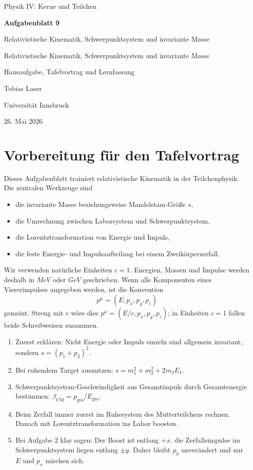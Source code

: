 \documentclass[11pt,a4paper]{scrartcl}
\newcommand{\CourseTitle}{COURSE NAME}
\newcommand{\DocumentKind}{DOCUMENT KIND}
\newcommand{\DocumentTitle}{DOCUMENT TITLE}
\newcommand{\DocumentSubtitle}{}
\newcommand{\AuthorName}{YOUR NAME}
\newcommand{\InstitutionName}{INSTITUTION NAME}
\newcommand{\SubmissionDate}{\today}
\newcommand{\makeuniversitytitle}{%
    \begin{titlepage}
        \centering
        \vspace*{2cm}
        {\Large \CourseTitle\par}
        \vspace{1.2cm}
        {\huge\bfseries \DocumentTitle\par}
        \ifx\DocumentSubtitle\empty\else
            \vspace{0.4cm}
            {\Large \DocumentSubtitle\par}
        \fi
        \vspace{1cm}
        {\Large \DocumentKind\par}
        \vfill
        {\large \AuthorName\par}
        \vspace{0.2cm}
        {\large \InstitutionName\par}
        \vspace{0.8cm}
        {\large \SubmissionDate\par}
    \end{titlepage}
    \pagenumbering{arabic}
}
\renewcommand{\CourseTitle}{Physik IV: Kerne und Teilchen}
\renewcommand{\DocumentKind}{Hausaufgabe, Tafelvortrag und Lernfassung}
\renewcommand{\DocumentTitle}{Aufgabenblatt 9}
\renewcommand{\DocumentSubtitle}{Relativistische Kinematik, Schwerpunktsystem und invariante Masse}
\renewcommand{\AuthorName}{Tobias Laser}
\renewcommand{\InstitutionName}{Universit\"at Innsbruck}
\renewcommand{\SubmissionDate}{26. Mai 2026}
\newcommand{\MeV}{\si{MeV}}
\newcommand{\GeV}{\si{GeV}}
\theoremstyle{definition}
\theoremstyle{plain}
\theoremstyle{remark}
\begin{document}
\makeuniversitytitle
\tableofcontents
\newpage


\section*{Vorbereitung f\"ur den Tafelvortrag}

\begin{summarybox}[title={Was man aus diesem Blatt lernen soll}]
Dieses Aufgabenblatt trainiert relativistische Kinematik in der Teilchenphysik. Die zentralen Werkzeuge sind
\begin{itemize}
    \item die invariante Masse beziehungsweise Mandelstam-Gr\"o\ss e $s$,
    \item die Umrechnung zwischen Laborsystem und Schwerpunktsystem,
    \item die Lorentztransformation von Energie und Impuls,
    \item die feste Energie- und Impulsaufteilung bei einem Zweik\"orperzerfall.
\end{itemize}
Wir verwenden nat\"urliche Einheiten $c=1$. Energien, Massen und Impulse werden deshalb in $\MeV$ oder $\GeV$ geschrieben. Wenn alle Komponenten eines Viererimpulses angegeben werden, ist die Konvention
\[
    p^\mu = (E,p_x,p_y,p_z)
\]
gemeint. Streng mit $c$ w\"are dies $p^\mu=(E/c,p_x,p_y,p_z)$; in Einheiten $c=1$ fallen beide Schreibweisen zusammen.
\end{summarybox}

\begin{presentationbox}[title={Roter Faden f\"ur den Vortrag}]
\begin{enumerate}
    \item Zuerst erkl\"aren: Nicht Energie oder Impuls einzeln sind allgemein invariant, sondern $s=(p_1+p_2)^2$.
    \item Bei ruhendem Target ausnutzen: $s=m_1^2+m_2^2+2m_2E_1$.
    \item Schwerpunktsystem-Geschwindigkeit aus Gesamtimpuls durch Gesamtenergie bestimmen: $\beta_{\mathrm{CM}}=p_{\mathrm{ges}}/E_{\mathrm{ges}}$.
    \item Beim Zerfall immer zuerst im Ruhesystem des Mutterteilchens rechnen. Danach mit Lorentztransformation ins Labor boosten.
    \item Bei Aufgabe 2 klar sagen: Der Boost ist entlang $+x$, die Zerfallsimpulse im Schwerpunktsystem liegen entlang $\pm y$. Daher bleibt $p_y$ unver\"andert und nur $E$ und $p_x$ mischen sich.
\end{enumerate}
\end{presentationbox}
\end{document}
